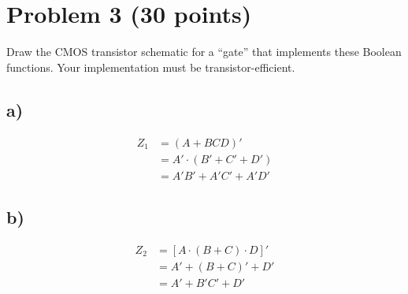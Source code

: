 \documentclass{article}
\begin{document}
\section*{Problem 3 (30 points)}
Draw the CMOS transistor schematic for a “gate” that implements these Boolean functions. Your implementation must be transistor-efficient.
\subsection*{a)}
\begin{align}
Z_1 &= (A+ BCD)'\\
&= A' \cdot(B'+C'+D')\\
&=  A'B'+ A'C'+ A'D'
\end{align}
\begin{center}
\end{center}
\subsection*{b)}
\begin{align}
    Z_2 &= [A \cdot (B+ C)\cdot D]'\\
    &= A' + (B + C)' + D' \\
    &= A' + B'C' + D'
\end{align}
\begin{center}
\end{center}
\newpage
\end{document}
